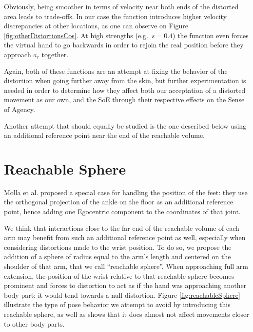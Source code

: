 Obviously, being smoother in terms of velocity near both ends of the distorted area leads to trade-offs. In our case the function introduces higher velocity discrepancies at other locations, as one can observe on Figure \ref{fig:otherDistortionsCos}. At high strengths (e.g.\ $s=0.4$) the function even forces the virtual hand to go backwards in order to rejoin the real position before they approach $a_r$ together.

Again, both of these functions are an attempt at fixing the behavior of the distortion when going further away from the skin, but further experimentation is needed in order to determine how they affect both our acceptation of a distorted movement as our own, and the SoE through their respective effects on the Sense of Agency.

Another attempt that should equally be studied is the one described below using an additional reference point near the end of the reachable volume.

\section{Reachable Sphere}
\label{sec:reachableSphere}

Molla et al. \cite{molla2017egocentric} proposed a special case for handling the position of the feet: they use the orthogonal projection of the ankle on the floor as an additional reference point, hence adding one Egocentric component to the coordinates of that joint.

We think that interactions close to the far end of the reachable volume of each arm may benefit from such an additional reference point as well, especially when considering distortions made to the wrist position. To do so, we propose the addition of a sphere of radius equal to the arm's length and centered on the shoulder of that arm, that we call ``reachable sphere''. When approaching full arm extension, the position of the wrist relative to that reachable sphere becomes prominent and forces to distortion to act as if the hand was approaching another body part: it would tend towards a null distortion. Figure \ref{fig:reachableSphere} illustrate the type of pose behavior we attempt to avoid by introducing this reachable sphere, as well as shows that it does almost not affect movements closer to other body parts.

